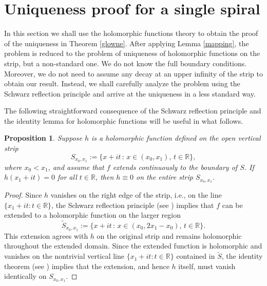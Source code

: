 \documentclass[11pt, letterpaper, reqno]{amsart}
\numberwithin{equation}{section}
\theoremstyle{definition}
\theoremstyle{plain}
\newtheorem{prop}[defi]{Proposition}
\numberwithin{equation}{section}
\def\R{\mathbb{R}}
\begin{document}
\section{Uniqueness proof for a single spiral}\label{jedna_spirala}
In this section we shall use the holomorphic functions theory to obtain the proof of the uniqueness in Theorem \ref{glowne}. After applying Lemma \ref{mapping}, the problem is reduced to the problem of uniqueness of holomorphic functions on the strip, but a non-standard one. We do not know the full boundary conditions. Moreover, we do not need to assume any decay at an upper infinity of the strip to obtain our result. Instead, we shall carefully analyze the problem using the Schwarz reflection principle and arrive at the uniqueness in a less standard way.

The following straightforward consequence of the Schwarz reflection principle and the identity lemma for holomorphic functions will be useful in what follows.
\begin{prop}\label{holojedno}
Suppose $h$ is a holomorphic function defined on the open vertical strip
\[
S_{x_{0},x_{1}} := \{x + it \,:\, x \in (x_0, x_1), \, t \in \R\},
\]
where $x_0 < x_1$, and assume that $f$ extends continuously to the boundary of $S$. If $h(x_1 + it) = 0$ for all $t \in \R$, then $h \equiv 0$ on the entire strip $S_{x_{0},x_{1}}$.
\end{prop}
\begin{proof}
Since $h$ vanishes on the right edge of the strip, i.e., on the line $\{x_1 + it : t \in \R\}$, the Schwarz reflection principle (see \cite[Theorem 11.14]{Rudin}) implies that $f$ can be extended to a holomorphic function on the larger region
\[
\widetilde{S}_{x_{0},x_{1}} := \{x + it \,:\, x \in (x_0, 2x_1 - x_0), \, t \in \R\}.
\]
This extension agrees with $h$ on the original strip and remains holomorphic throughout the extended domain. Since the extended function is holomorphic and vanishes on the nontrivial vertical line $\{x_1 + it : t \in \R\}$ contained in $\widetilde{S}$, the identity theorem (see \cite[Corollary, p.~209]{Rudin}) implies that the extension, and hence $h$ itself, must vanish identically on $S_{x_{0},x_{1}}$.
\end{proof}
\end{document}
